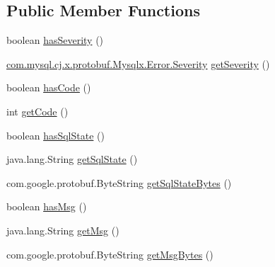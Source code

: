 \subsection*{Public Member Functions}
\begin{DoxyCompactItemize}
\item 
boolean \mbox{\hyperlink{interfacecom_1_1mysql_1_1cj_1_1x_1_1protobuf_1_1_mysqlx_1_1_error_or_builder_af0e1ac59a263e4fd0714f3e7692f2c2f}{has\+Severity}} ()
\item 
\mbox{\hyperlink{enumcom_1_1mysql_1_1cj_1_1x_1_1protobuf_1_1_mysqlx_1_1_error_1_1_severity}{com.\+mysql.\+cj.\+x.\+protobuf.\+Mysqlx.\+Error.\+Severity}} \mbox{\hyperlink{interfacecom_1_1mysql_1_1cj_1_1x_1_1protobuf_1_1_mysqlx_1_1_error_or_builder_aa6ee1e869b417b62f5c03c557374153e}{get\+Severity}} ()
\item 
boolean \mbox{\hyperlink{interfacecom_1_1mysql_1_1cj_1_1x_1_1protobuf_1_1_mysqlx_1_1_error_or_builder_af5f587651f0fb6d81712f2aa3eeb1f60}{has\+Code}} ()
\item 
int \mbox{\hyperlink{interfacecom_1_1mysql_1_1cj_1_1x_1_1protobuf_1_1_mysqlx_1_1_error_or_builder_a432cc383eaf3640403500f3ee3d0fde2}{get\+Code}} ()
\item 
boolean \mbox{\hyperlink{interfacecom_1_1mysql_1_1cj_1_1x_1_1protobuf_1_1_mysqlx_1_1_error_or_builder_ad57db04f34fef4eda2078c25f5c784df}{has\+Sql\+State}} ()
\item 
java.\+lang.\+String \mbox{\hyperlink{interfacecom_1_1mysql_1_1cj_1_1x_1_1protobuf_1_1_mysqlx_1_1_error_or_builder_a4db16006075d642b4cb528f4e6dae4b1}{get\+Sql\+State}} ()
\item 
com.\+google.\+protobuf.\+Byte\+String \mbox{\hyperlink{interfacecom_1_1mysql_1_1cj_1_1x_1_1protobuf_1_1_mysqlx_1_1_error_or_builder_a871e8ceab83fd45be9b6fa828eeed838}{get\+Sql\+State\+Bytes}} ()
\item 
boolean \mbox{\hyperlink{interfacecom_1_1mysql_1_1cj_1_1x_1_1protobuf_1_1_mysqlx_1_1_error_or_builder_ab67b29cd2d75ded95dc4b4a282815890}{has\+Msg}} ()
\item 
java.\+lang.\+String \mbox{\hyperlink{interfacecom_1_1mysql_1_1cj_1_1x_1_1protobuf_1_1_mysqlx_1_1_error_or_builder_aa126aae4f21f94def5b9da0fd8147757}{get\+Msg}} ()
\item 
com.\+google.\+protobuf.\+Byte\+String \mbox{\hyperlink{interfacecom_1_1mysql_1_1cj_1_1x_1_1protobuf_1_1_mysqlx_1_1_error_or_builder_ace535901d9b816ac4537475c042e0bd8}{get\+Msg\+Bytes}} ()
\end{DoxyCompactItemize}


